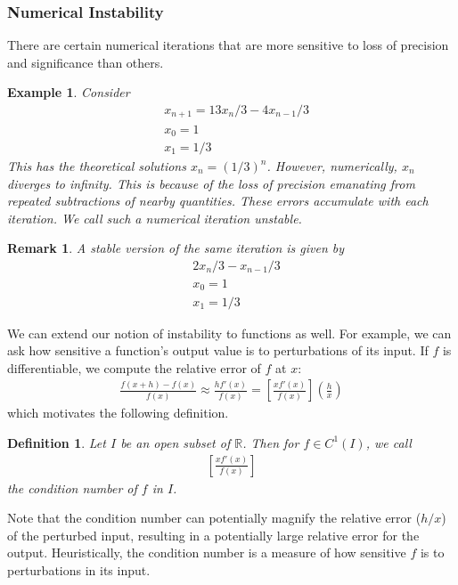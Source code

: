 \documentclass[12pt,reqno]{amsart}
\numberwithin{equation}{section}  %
\newcommand{\rr}{\mathbb{R}}
\newtheorem{definition}[theorem]{Definition}
\newtheorem{remark}[theorem]{Remark}
\newtheorem{example}{Example}[section]
\begin{document}
\subsubsection{Numerical Instability}
There are certain numerical iterations that are more sensitive
to loss of precision and significance than others.
\begin{example}
Consider
\begin{align*}
& x_{n+1} = 13x_n/3 - 4x_{n-1}/3
\\
& x_0 = 1
\\
& x_1 = 1/3
\end{align*}
This has the theoretical solutions $x_n = (1/3)^n$. However, numerically,
$x_n$ diverges to infinity. This is because of the loss of precision
emanating from repeated subtractions of nearby quantities. These
errors accumulate with each iteration. We call such a numerical iteration
\emph{unstable}.
\end{example}
\begin{remark}
A stable version of the same iteration is given by
\begin{align*}
& 2 x_n /3 - x_{n-1}/3
\\
& x_0 = 1
\\
& x_1 = 1/3
\end{align*}
\end{remark}
We can extend our notion of instability to functions as well.
For example, we can ask how sensitive a function's output value is
to perturbations of its input. If $f$ is differentiable, we compute
the relative error of $f$ at $x$:
\begin{align*}
\frac{f(x + h) - f(x)}{f(x)} \approx \frac{h f'(x)}{f(x)} = 
\left[ \frac{x f'(x)}{f(x)}\right]\left( \frac{h}{x}\right)
\end{align*}
which motivates the following definition.
\begin{definition}
Let $I$ be an open subset of $\rr$. Then for $f \in C^1(I)$, 
we call 
\begin{align*}
\left[ \frac{x f'(x)}{f(x)}\right]
\end{align*}
the \emph{condition number} of $f$ in $I$.
\end{definition}
Note that the condition number can potentially magnify
the relative error ($h/x$) of the perturbed input, resulting
in a potentially large relative error for the output. Heuristically,
the condition number is a measure of how sensitive $f$ is to perturbations
in its input.
\end{document}

